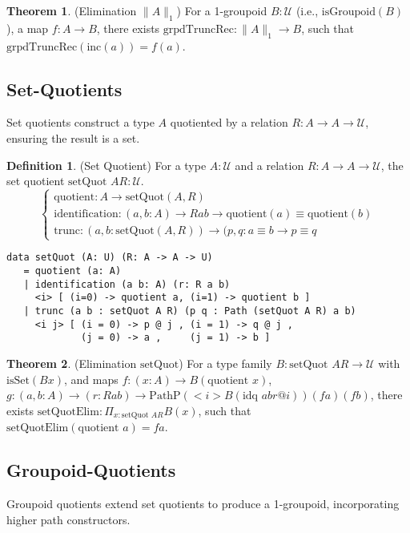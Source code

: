 \documentclass{article}
\theoremstyle{definition}
\newtheorem{theorem}{Theorem}
\newtheorem{definition}{Definition}
\begin{document}
\begin{theorem} (Elimination $\| A \|_1$)
For a 1-groupoid $B : \mathcal{U}$ (i.e., $\text{isGroupoid}(B)$),
a map $f : A \to B$, there exists $\text{grpdTruncRec} : \| A \|_1 \to B$,
such that $\text{grpdTruncRec}(\text{inc}(a)) = f(a)$.
\end{theorem}

\newpage

\subsection{Set-Quotients}
Set quotients construct a type $A$ quotiented by a
relation $R : A \to A \to \mathcal{U}$, ensuring the result is a set.

\begin{definition} (Set Quotient)
For a type $A : \mathcal{U}$ and a relation $R : A \to A \to \mathcal{U}$,
the set quotient $\text{setQuot } A R : \mathcal{U}$.
\[
\begin{cases}
\text{quotient} : A \to \text{setQuot}(A,R) \\
\text{identification} : (a, b : A) \to R a b \to \text{quotient}(a) \equiv \text{quotient}(b) \\
\text{trunc} : (a, b : \text{setQuot}(A,R)) \to (p, q : a \equiv b \to p \equiv q
\end{cases}
\]
\begin{lstlisting}
data setQuot (A: U) (R: A -> A -> U)
   = quotient (a: A)
   | identification (a b: A) (r: R a b)
     <i> [ (i=0) -> quotient a, (i=1) -> quotient b ]
   | trunc (a b : setQuot A R) (p q : Path (setQuot A R) a b)
     <i j> [ (i = 0) -> p @ j , (i = 1) -> q @ j ,
             (j = 0) -> a ,     (j = 1) -> b ]
\end{lstlisting}
\end{definition}

\begin{theorem} (Elimination $\text{setQuot}$)
For a type family $B : \text{setQuot } A R \to \mathcal{U}$ with $\text{isSet}(B x)$,
and maps $f : (x : A) \to B(\text{quotient } x)$,
$g : (a, b : A) \to (r : R a b) \to \text{PathP} (<i> B(\text{idq } a b r @ i)) (f a) (f b)$,
there exists $\text{setQuotElim} : \Pi_{x:\text{setQuot } A R} B(x)$, such that $\text{setQuotElim}(\text{quotient } a) = f a$.
\end{theorem}

\subsection{Groupoid-Quotients}
Groupoid quotients extend set quotients to produce a 1-groupoid,
incorporating higher path constructors.
\end{document}
